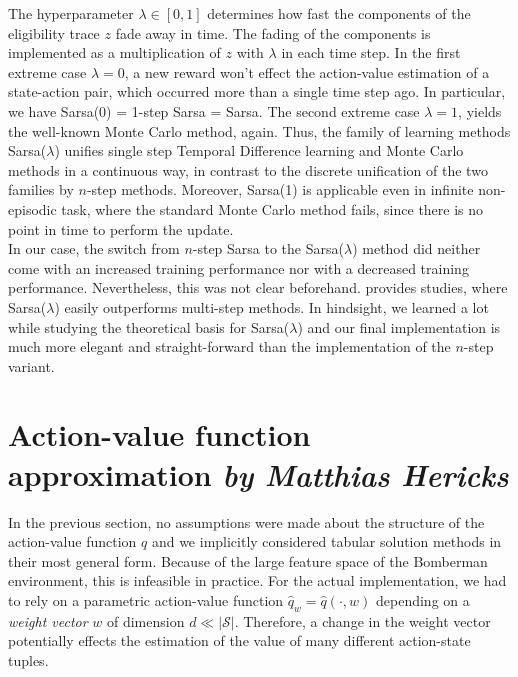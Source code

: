 The hyperparameter $\lambda \in [0, 1]$ determines how fast the components of the eligibility trace $z$ fade away in time. The fading of the components is implemented as a multiplication of $z$ with $\lambda$ in each time step. In the first extreme case $\lambda = 0$, a new reward won't effect the action-value estimation of a state-action pair, which occurred more than a single time step ago. In particular, we have Sarsa(0) = 1-step Sarsa = Sarsa. The second extreme case $\lambda = 1$, yields the well-known Monte Carlo method, again. Thus, the family of learning methods Sarsa($\lambda$) unifies single step Temporal Difference learning and Monte Carlo methods in a continuous way, in contrast to the discrete unification of the two families by $n$-step methods. Moreover, Sarsa(1) is applicable even in infinite non-episodic task, where the standard Monte Carlo method fails, since there is no point in time to perform the update. \\

In our case, the switch from $n$-step Sarsa to the Sarsa($\lambda$) method did neither come with an increased training performance nor with a decreased training performance. Nevertheless, this was not clear beforehand. \cite{Sutton1998} provides studies, where Sarsa($\lambda$) easily outperforms multi-step methods. In hindsight, we learned a lot while studying the theoretical basis for Sarsa($\lambda$) and our final implementation is much more elegant and straight-forward than the implementation of the $n$-step variant. \\

\section[Action-value function approximation]{Action-value function approximation \hfill \small \normalfont\textit{by Matthias Hericks}}

In the previous section, no assumptions were made about the structure of the action-value function $q$ and we implicitly considered tabular solution methods in their most general form. Because of the large feature space of the Bomberman environment, this is infeasible in practice. For the actual implementation, we had to rely on a parametric action-value function $\hat q_{w} = \hat q(\cdot, w)$ depending on a \emph{weight vector} $w$ of dimension $d \ll |\mathcal{S}|$. Therefore, a change in the weight vector potentially effects the estimation of the value of many different action-state tuples. \\

